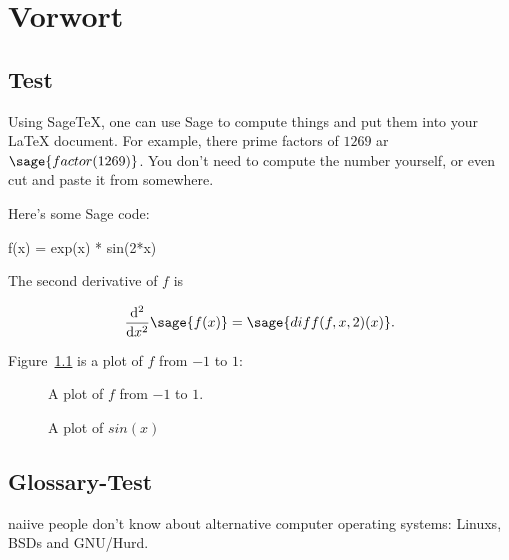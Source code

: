 \chapter{Vorwort}
\section{Test}
Using Sage\TeX, one can use Sage to compute things and put them into
your \LaTeX{} document. For example, there prime factors of $1269$ ar $\sage{factor(1269)}$.
You don't need to compute the number yourself, or even cut and paste
it from somewhere.

Here's some Sage code:

\begin{sageblock}
    f(x) = exp(x) * sin(2*x)
\end{sageblock}

The second derivative of $f$ is

\[
  \frac{\mathrm{d}^{2}}{\mathrm{d}x^{2}} \sage{f(x)} =
  \sage{diff(f, x, 2)(x)}.
\]

Figure~\ref{fig:sage} is a plot of $f$ from $-1$ to $1$:
\begin{figure}[h]
\caption{A plot of $f$ from $-1$ to $1$.}
\centering
\label{fig:sage}
\end{figure}

\begin{figure}
\caption{A plot of $sin(x)$}
\centering
\label{fig:sin}
\end{figure}

\section{Glossary-Test}
\Gls{naiive} people don't know about
alternative \gls{computer} operating systems:
\glspl{Linux}, BSDs and GNU/Hurd.
